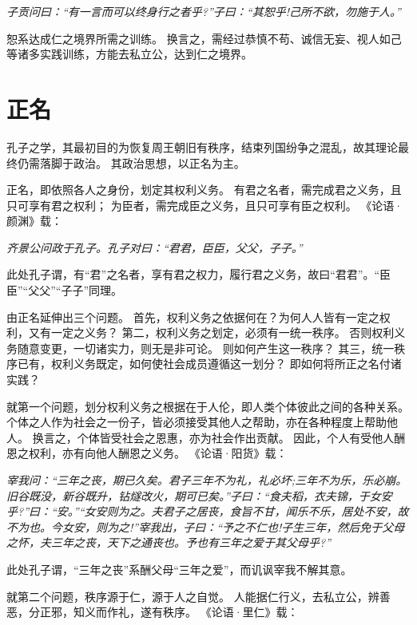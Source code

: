 \documentclass[11pt]{article}
\begin{document}
\textit{子贡问曰：“有一言而可以终身行之者乎?”子曰：“其恕乎!己所不欲，勿施于人。”}

恕系达成仁之境界所需之训练。
换言之，需经过恭慎不苟、诚信无妄、视人如己等诸多实践训练，方能去私立公，达到仁之境界。

\section{正名}
孔子之学，其最初目的为恢复周王朝旧有秩序，结束列国纷争之混乱，故其理论最终仍需落脚于政治。
其政治思想，以正名为主。

\newline

正名，即依照各人之身份，划定其权利义务。
有君之名者，需完成君之义务，且只可享有君之权利；
为臣者，需完成臣之义务，且只可享有臣之权利。
《论语·颜渊》载：

\textit{齐景公问政于孔子。孔子对曰：“君君，臣臣，父父，子子。”}

此处孔子谓，有“君”之名者，享有君之权力，履行君之义务，故曰“君君”。“臣臣”“父父”“子子”同理。

\newline

由正名延伸出三个问题。
首先，权利义务之依据何在？为何人人皆有一定之权利，又有一定之义务？
第二，权利义务之划定，必须有一统一秩序。
否则权利义务随意变更，一切诸实力，则无是非可论。
则如何产生这一秩序？
其三，统一秩序已有，权利义务既定，如何使社会成员遵循这一划分？
即如何将所正之名付诸实践？

\newline

就第一个问题，划分权利义务之根据在于人伦，即人类个体彼此之间的各种关系。
个体之人作为社会之一份子，皆必须接受其他人之帮助，亦在各种程度上帮助他人。
换言之，个体皆受社会之恩惠，亦为社会作出贡献。
因此，个人有受他人酬恩之权利，亦有向他人酬恩之义务。
《论语·阳货》载：

\textit{宰我问：“三年之丧，期已久矣。君子三年不为礼，礼必坏;三年不为乐，乐必崩。旧谷既没，新谷既升，钻燧改火，期可已矣。”子曰：“食夫稻，衣夫锦，于女安乎?”曰：“安。”“女安则为之。夫君子之居丧，食旨不甘，闻乐不乐，居处不安，故不为也。今女安，则为之!”宰我出，子曰：“予之不仁也!子生三年，然后免于父母之怀，夫三年之丧，天下之通丧也。予也有三年之爱于其父母乎?”}

此处孔子谓，“三年之丧”系酬父母“三年之爱”，而讥讽宰我不解其意。

就第二个问题，秩序源于仁，源于人之自觉。
人能据仁行义，去私立公，辨善恶，分正邪，知义而作礼，遂有秩序。
《论语·里仁》载：
\end{document}
